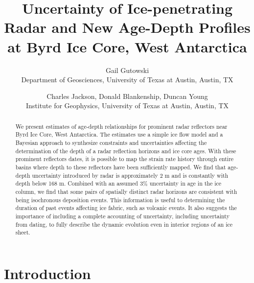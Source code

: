 \documentclass[12pt]{article}
\begin{document}
\title{Uncertainty of Ice-penetrating Radar and New Age-Depth Profiles at Byrd Ice Core, West Antarctica}
\author{Gail Gutowski\\ Department of Geosciences, University of Texas at Austin, Austin, TX \and Charles Jackson, Donald Blankenship, Duncan Young \\Institute for Geophysics, University of Texas at Austin, Austin, TX}
\maketitle


\begin{abstract}

We present estimates of age-depth relationships for prominent radar reflectors near Byrd Ice Core, West Antarctica. The estimates use a simple ice flow model and a Bayesian approach to synthesize constraints and uncertainties affecting the determination of the depth of a radar reflection horizons and ice core ages. With these prominent reflectors dates, it is possible to map the strain rate history through entire basins where depth to these reflectors have been sufficiently mapped. We find that age-depth uncertainty introduced by radar is approximately 2 m and is constantly with depth below 168 m. Combined with an assumed 3\% uncertainty in age in the ice column, we find that some pairs of spatially distinct radar horizons are consistent with being isochronous deposition events. This information is useful to determining the duration of past events affecting ice fabric, such as volcanic events. It also suggests the importance of including a complete accounting of uncertainty, including uncertainty from dating, to fully describe the dynamic evolution even in interior regions of an ice sheet.
\end{abstract}

\section{Introduction}
\end{document}
